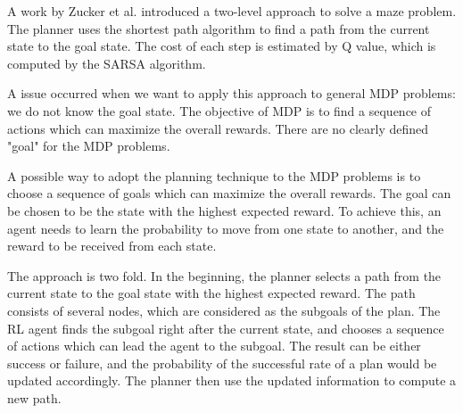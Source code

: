 A work by Zucker et al. \cite{Planner} introduced a two-level approach to solve a maze problem.
The planner uses the shortest path algorithm to find a path from the current state to the goal state.
The cost of each step is estimated by Q value, which is computed by the SARSA algorithm.

A issue occurred when we want to apply this approach to general MDP problems: we do not know the 
goal state. The objective of MDP is to find a sequence of actions which can maximize the overall 
rewards. There are no clearly defined "goal" for the MDP problems.

A possible way to adopt the planning technique to the MDP problems is to choose a sequence 
of goals which can maximize the overall rewards. The goal can be chosen to be the state
with the highest expected reward. To achieve this, an agent needs to learn 
the probability to move from one state to another, and the reward to be received
from each state. 

The approach is two fold. In the beginning, the planner selects a path from the current 
state to the goal state with the highest expected reward. The path consists of several
nodes, which are considered as the subgoals of the plan. The RL agent finds the subgoal 
right after the current state, and chooses a sequence of actions which can lead the agent
to the subgoal. The result can be either success or failure, and the probability of the successful
rate of a plan would be updated accordingly. The planner then use the updated information to 
compute a new path.



